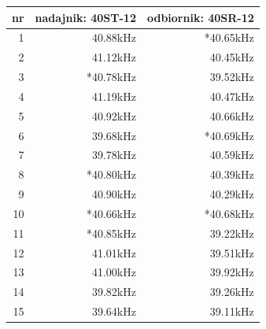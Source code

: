 \begin{center}
  \begin{tabular}{|r|r|r|}
    \hline 
    nr & nadajnik: 40ST-12 & odbiornik: 40SR-12\\
    \hline
    1  &   40.88kHz & *40.65kHz \\
    2  &   41.12kHz &  40.45kHz \\
    3  &  *40.78kHz &  39.52kHz \\
    4  &   41.19kHz &  40.47kHz \\
    5  &   40.92kHz &  40.66kHz \\
    6  &   39.68kHz & *40.69kHz \\
    7  &   39.78kHz &  40.59kHz \\
    8  &  *40.80kHz &  40.39kHz \\
    9  &   40.90kHz &  40.29kHz \\
    10 &  *40.66kHz & *40.68kHz \\
    11 &  *40.85kHz &  39.22kHz \\
    12 &   41.01kHz &  39.51kHz \\
    13 &   41.00kHz &  39.92kHz \\
    
    14 &   39.82kHz &  39.26kHz \\
    15 &   39.64kHz &  39.11kHz \\
    \hline
  \end{tabular}
\end{center}


